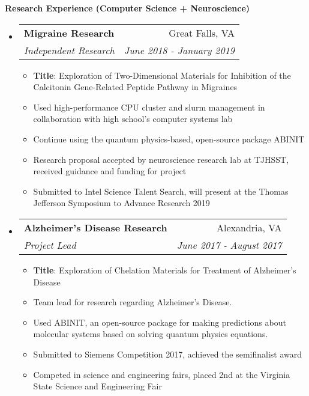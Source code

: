 \documentclass[letterpaper,11pt]{article}
\makeatletter
\newcommand{\resitem}[1]{\item #1 \vspace{-2pt}}
\newcommand{\resheading}[1]{{\large \colorbox{mygrey}{\begin{minipage}{\textwidth}{\textbf{#1 \vphantom{p\^{E}}}}\end{minipage}}}}
\newcommand{\ressubheading}[4]{
\begin{tabular*}{7.0in}{l@{\extracolsep{\fill}}r}
		\textbf{#1} & #2 \\
		\textit{#3} & \textit{#4} \\
\end{tabular*}\vspace{-6pt}}
\makeatother
\begin{document}
\resheading{Research Experience (Computer Science + Neuroscience)}
\begin{itemize}
\item
	\ressubheading{Migraine Research}{Great Falls, VA}{Independent Research}{June 2018 - January 2019}
	\begin{itemize}
		\resitem{\textbf{Title}: Exploration of Two-Dimensional Materials for Inhibition of the 
	Calcitonin Gene-Related Peptide Pathway in Migraines}
	    \resitem{Used high-performance CPU cluster and slurm management in collaboration with high school's computer systems lab}
	    \resitem{Continue using the quantum physics-based, open-source package ABINIT}
	    \resitem{Research proposal accepted by neuroscience research lab at TJHSST, received guidance and funding for project}
	    \resitem{Submitted to Intel Science Talent Search, will present at the Thomas Jefferson Symposium to Advance Research 2019}
	\end{itemize}
\item
	\ressubheading{Alzheimer's Disease Research}{Alexandria, VA}{Project Lead}{June 2017 - August 2017}
	\begin{itemize}
	    \resitem{\textbf{Title}: Exploration of Chelation Materials for Treatment of Alzheimer's Disease}
		\resitem{Team lead for research regarding Alzheimer's Disease.}
		\resitem{Used ABINIT, an open-source package for making predictions about molecular systems based on solving quantum physics equations.}
		\resitem{Submitted to Siemens Competition 2017, achieved the semifinalist award}
		\resitem{Competed in science and engineering fairs, placed 2nd at the Virginia State Science and Engineering Fair}

\end{itemize}
\end{itemize}
\end{document}
